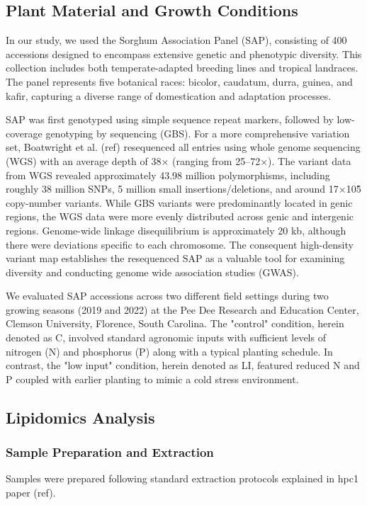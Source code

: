 \documentclass[10pt,letterpaper]{article}
\begin{document}
\subsection*{Plant Material and Growth Conditions}
In our study, we used the Sorghum Association Panel (SAP), consisting of 400 accessions designed to encompass extensive genetic and phenotypic diversity. This collection includes both temperate-adapted breeding lines and tropical landraces. The panel represents five botanical races: bicolor, caudatum, durra, guinea, and kafir, capturing a diverse range of domestication and adaptation processes.

SAP was first genotyped using simple sequence repeat markers, followed by low-coverage genotyping by sequencing (GBS). For a more comprehensive variation set, Boatwright et al. (ref) resequenced all entries using whole genome sequencing (WGS) with an average depth of 38× (ranging from 25–72×). The variant data from WGS revealed approximately 43.98 million polymorphisms, including roughly 38 million SNPs, 5 million small insertions/deletions, and around 17×10\^5 copy-number variants. While GBS variants were predominantly located in genic regions, the WGS data were more evenly distributed across genic and intergenic regions. Genome-wide linkage disequilibrium is approximately 20 kb, although there were deviations specific to each chromosome. The consequent high-density variant map establishes the resequenced SAP as a valuable tool for examining diversity and conducting genome wide association studies (GWAS).

We evaluated SAP accessions across two different field settings during two growing seasons (2019 and 2022) at the Pee Dee Research and Education Center, Clemson University, Florence, South Carolina. The "control" condition, herein denoted as C, involved standard agronomic inputs with sufficient levels of nitrogen (N) and phosphorus (P) along with a typical planting schedule. In contrast, the "low input" condition, herein denoted as LI,  featured reduced N and P coupled with earlier planting to mimic a cold stress environment.

\subsection*{Lipidomics Analysis}

\subsubsection*{Sample Preparation and Extraction}
Samples were prepared following standard extraction protocols explained in hpc1 paper (ref).
\end{document}
